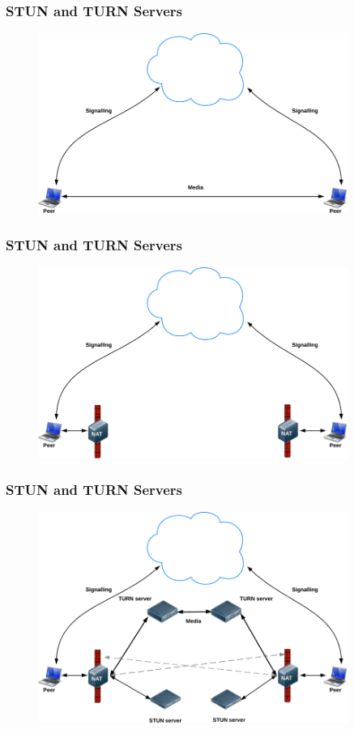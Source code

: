 \documentclass{beamer}
\begin{document}
\begin{frame}[t]\frametitle{STUN and TURN Servers}
\begin{figure}
\centering
\includegraphics[keepaspectratio=true, width=0.9\textwidth]{images/noSTUNorTURN}
\end{figure}
\end{frame}



\begin{frame}[t]\frametitle{STUN and TURN Servers}
\begin{figure}
\centering
\includegraphics[keepaspectratio=true, width=0.9\textwidth]{images/firewall}
\end{figure}
\end{frame}

\begin{frame}[t]\frametitle{STUN and TURN Servers}
\begin{figure}
\centering
\includegraphics[keepaspectratio=true, width=0.9\textwidth]{images/turn}
\end{figure}
\end{frame}
\end{document}
